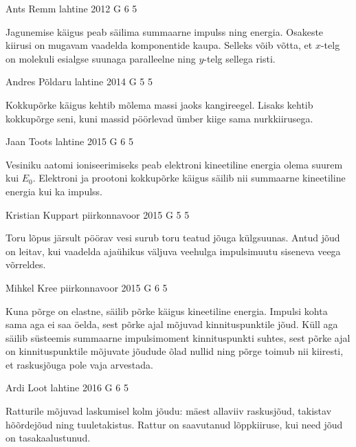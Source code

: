 \documentclass[11pt]{article}
\begin{document}
{%
{Ants Remm} %
{lahtine} %
{2012} %
{G 6} %
{5} %
{

\ifHint
Jagunemise käigus peab säilima summaarne impulss ning energia. Osakeste kiirusi on mugavam vaadelda komponentide kaupa. Selleks võib võtta, et $x$-telg on molekuli esialgse suunaga paralleelne ning $y$-telg sellega risti.
\fi
}

{Andres Põldaru} %
{lahtine} %
{2014} %
{G 5} %
{5} %
{

\ifHint
Kokkupõrke käigus kehtib mõlema massi jaoks kangireegel. Lisaks kehtib kokkupõrge seni, kuni massid pöörlevad ümber kiige sama nurkkiirusega.
\fi
}

{Jaan Toots} %
{lahtine} %
{2015} %
{G 6} %
{5} %
{

\ifHint
Vesiniku aatomi ioniseerimiseks peab elektroni kineetiline energia olema suurem kui $E_0$. Elektroni ja prootoni kokkupõrke käigus säilib nii summaarne kineetiline energia kui ka impulss.
\fi
}

{Kristian Kuppart} %
{piirkonnavoor} %
{2015} %
{G 5} %
{5} %
{

\ifHint
Toru lõpus järsult pöörav vesi surub toru teatud jõuga külgsuunas. Antud jõud on leitav, kui vaadelda ajaühikus väljuva veehulga impulsimuutu siseneva veega võrreldes.
\fi
}

{Mihkel Kree} %
{piirkonnavoor} %
{2015} %
{G 6} %
{5} %
{

\ifHint
Kuna põrge on elastne, säilib põrke käigus kineetiline energia. Impulsi kohta sama aga ei saa öelda, sest põrke ajal mõjuvad kinnituspunktile jõud. Küll aga säilib süsteemis summaarne impulsimoment kinnituspunkti suhtes, sest põrke ajal on kinnituspunktile mõjuvate jõudude õlad nullid ning põrge toimub nii kiiresti, et raskusjõuga pole vaja arvestada.
\fi
}

{Ardi Loot} %
{lahtine} %
{2016} %
{G 6} %
{5} %
{

\ifHint
Ratturile mõjuvad laskumisel kolm jõudu: mäest allaviiv raskusjõud, takistav hõõrdejõud ning tuuletakistus. Rattur on saavutanud lõppkiiruse, kui need jõud on tasakaalustunud.
\fi
}

}
\end{document}
